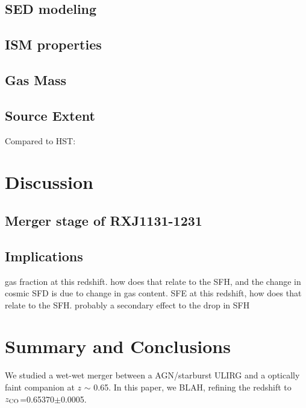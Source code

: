 \documentclass[]{emulateapj}
\begin{document}
\subsection{SED modeling}
\subsection{ISM properties}
\subsection{Gas Mass}
\subsection{Source Extent}
Compared to HST:

\section{Discussion}
\subsection{Merger stage of RXJ1131-1231}



\subsection{Implications}
gas fraction at this redshift. how does that relate to
the SFH, and the change in cosmic SFD is due to change in gas content.
SFE at this redshift, how does that relate to the SFH. probably a secondary effect to the drop in SFH


\section{Summary and Conclusions}
We studied a wet-wet merger between a AGN/starburst ULIRG and a optically faint companion at $z$ $\sim$ 0.65.
In this paper, we BLAH, refining the redshift to $z_{\rm CO}$=0.65370$\pm$0.0005.






\acknowledgments




\end{document}

